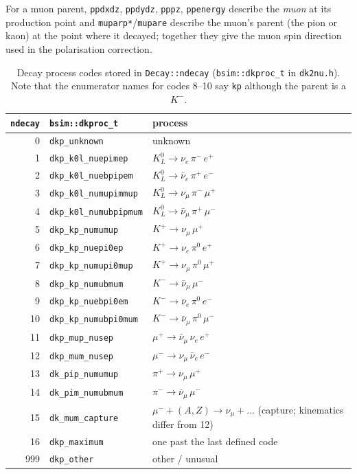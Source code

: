 \documentclass[11pt]{article}
\newcommand{\code}[1]{\texttt{#1}}
\begin{document}
For a muon parent, \code{ppdxdz}, \code{ppdydz}, \code{pppz},
\code{ppenergy} describe the \emph{muon} at its production point and
\code{muparp*}/\code{mupare} describe the muon's parent (the pion or kaon)
at the point where it decayed; together they give the muon spin direction
used in the polarisation correction.

\begin{table}[htb]
\centering\small
\begin{tabular}{rll}
\toprule
\code{ndecay} & \code{bsim::dkproc\_t} & process \\ \midrule
 0 & \code{dkp\_unknown}         & unknown \\
 1 & \code{dkp\_k0l\_nuepimep}    & $K^0_L \to \nu_e\,\pi^-\,e^+$ \\
 2 & \code{dkp\_k0l\_nuebpipem}   & $K^0_L \to \bar\nu_e\,\pi^+\,e^-$ \\
 3 & \code{dkp\_k0l\_numupimmup}  & $K^0_L \to \nu_\mu\,\pi^-\,\mu^+$ \\
 4 & \code{dkp\_k0l\_numubpipmum} & $K^0_L \to \bar\nu_\mu\,\pi^+\,\mu^-$ \\
 5 & \code{dkp\_kp\_numumup}      & $K^+ \to \nu_\mu\,\mu^+$ \\
 6 & \code{dkp\_kp\_nuepi0ep}     & $K^+ \to \nu_e\,\pi^0\,e^+$ \\
 7 & \code{dkp\_kp\_numupi0mup}   & $K^+ \to \nu_\mu\,\pi^0\,\mu^+$ \\
 8 & \code{dkp\_kp\_numubmum}     & $K^- \to \bar\nu_\mu\,\mu^-$ \\
 9 & \code{dkp\_kp\_nuebpi0em}    & $K^- \to \bar\nu_e\,\pi^0\,e^-$ \\
10 & \code{dkp\_kp\_numubpi0mum}  & $K^- \to \bar\nu_\mu\,\pi^0\,\mu^-$ \\
11 & \code{dkp\_mup\_nusep}       & $\mu^+ \to \bar\nu_\mu\,\nu_e\,e^+$ \\
12 & \code{dkp\_mum\_nusep}       & $\mu^- \to \nu_\mu\,\bar\nu_e\,e^-$ \\
13 & \code{dk\_pip\_numumup}      & $\pi^+ \to \nu_\mu\,\mu^+$ \\
14 & \code{dk\_pim\_numubmum}     & $\pi^- \to \bar\nu_\mu\,\mu^-$ \\
15 & \code{dk\_mum\_capture}      & $\mu^- + (A,Z) \to \nu_\mu + \ldots$
                                    (capture; kinematics differ from 12) \\
16 & \code{dkp\_maximum}          & one past the last defined code \\
999 & \code{dkp\_other}           & other / unusual \\
\bottomrule
\end{tabular}
\caption{Decay process codes stored in \code{Decay::ndecay}
         (\code{bsim::dkproc\_t} in \code{dk2nu.h}).  Note that the
         enumerator names for codes 8--10 say \code{kp} although the
         parent is a $K^-$.}
\label{tab:dkproc}
\end{table}
\end{document}
